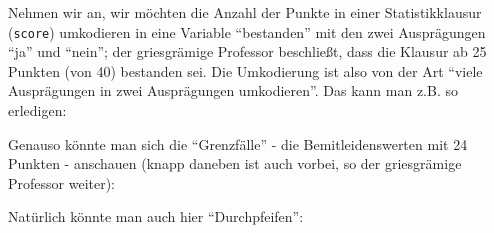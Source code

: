\documentclass[12pt,ngerman,]{book}
\makeatletter
\newenvironment{Shaded}{\begin{snugshade}}{\end{snugshade}}
\newcommand{\KeywordTok}[1]{\textcolor[rgb]{0.13,0.29,0.53}{\textbf{{#1}}}}
\newcommand{\DataTypeTok}[1]{\textcolor[rgb]{0.13,0.29,0.53}{{#1}}}
\newcommand{\DecValTok}[1]{\textcolor[rgb]{0.00,0.00,0.81}{{#1}}}
\newcommand{\StringTok}[1]{\textcolor[rgb]{0.31,0.60,0.02}{{#1}}}
\newcommand{\CommentTok}[1]{\textcolor[rgb]{0.56,0.35,0.01}{\textit{{#1}}}}
\newcommand{\NormalTok}[1]{{#1}}
\newenvironment{kframe}{%
\medskip{}
\setlength{\fboxsep}{.8em}
 \def\at@end@of@kframe{}%
 \ifinner\ifhmode%
  \def\at@end@of@kframe{\end{minipage}}%
  \begin{minipage}{\columnwidth}%
 \fi\fi%
 \def\FrameCommand##1{\hskip\@totalleftmargin \hskip-\fboxsep
 \colorbox{shadecolor}{##1}\hskip-\fboxsep
     \hskip-\linewidth \hskip-\@totalleftmargin \hskip\columnwidth}%
 \MakeFramed {\advance\hsize-\width
   \@totalleftmargin\z@ \linewidth\hsize
   \@setminipage}}%
 {\par\unskip\endMakeFramed%
 \at@end@of@kframe}
\renewenvironment{Shaded}{\begin{kframe}}{\end{kframe}}
\makeatother
\begin{document}
Nehmen wir an, wir möchten die Anzahl der Punkte in einer
Statistikklausur (\texttt{score}) umkodieren in eine Variable
``bestanden'' mit den zwei Ausprägungen ``ja'' und ``nein''; der
griesgrämige Professor beschließt, dass die Klausur ab 25 Punkten (von
40) bestanden sei. Die Umkodierung ist also von der Art ``viele
Ausprägungen in zwei Ausprägungen umkodieren''. Das kann man z.B. so
erledigen:

\begin{Shaded}
\end{Shaded}

Genauso könnte man sich die ``Grenzfälle'' - die Bemitleidenswerten mit
24 Punkten - anschauen (knapp daneben ist auch vorbei, so der
griesgrämige Professor weiter):

\begin{Shaded}
\end{Shaded}

Natürlich könnte man auch hier ``Durchpfeifen'':

\begin{Shaded}
\end{Shaded}
\end{document}
